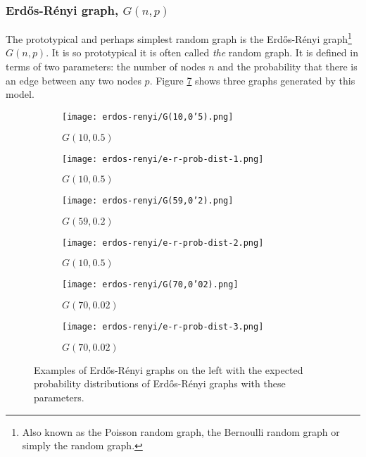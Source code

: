\subsubsection{Erd\H{o}s-R{\'e}nyi graph, $G(n,p)$}
The prototypical and perhaps simplest random graph is the Erd\H{o}s-R{\'e}nyi graph\footnote{Also known as the Poisson random graph, the Bernoulli random graph or simply the random graph.} $G(n,p)$. It is so prototypical it is often called \textit{the} random graph. It is defined in terms of two parameters: the number of nodes $n$ and the probability that there is an edge between any two nodes $p$. Figure \ref{fig:erdos-renyi-graphs} shows three graphs generated by this model.
\begin{figure}
	\centering
	\begin{subfigure}{.45\textwidth}
		\centering
		\texttt{[image: erdos-renyi/G(10,0'5).png]}
		\caption{$G(10,0.5)$}
		\label{fig:K5}
	\end{subfigure}
\begin{subfigure}{0.5\textwidth}
	\centering
	\texttt{[image: erdos-renyi/e-r-prob-dist-1.png]}
	\caption{$G(10,0.5)$}
	\label{fig:K5}
\end{subfigure}
	\begin{subfigure}{.45\textwidth}
		\centering
		\texttt{[image: erdos-renyi/G(59,0'2).png]}
		\caption{$G(59,0.2)$}
		\label{fig:K16}
	\end{subfigure}
\begin{subfigure}{0.5\textwidth}
	\centering
	\texttt{[image: erdos-renyi/e-r-prob-dist-2.png]}
	\caption{$G(10,0.5)$}
	\label{fig:K5}
\end{subfigure}
	\begin{subfigure}{.45\textwidth}
		\centering
		\texttt{[image: erdos-renyi/G(70,0'02).png]}
		\caption{$G(70,0.02)$}
		\label{fig:K16}
	\end{subfigure}
\begin{subfigure}{.5\textwidth}
	\centering
	\texttt{[image: erdos-renyi/e-r-prob-dist-3.png]}
	\caption{$G(70,0.02)$}
	\label{fig:K16}
\end{subfigure}
	\caption{Examples of Erd\H{o}s-R{\'e}nyi graphs on the left with the expected probability distributions of Erd\H{o}s-R{\'e}nyi graphs with these parameters.}
	\label{fig:erdos-renyi-graphs}
\end{figure}
